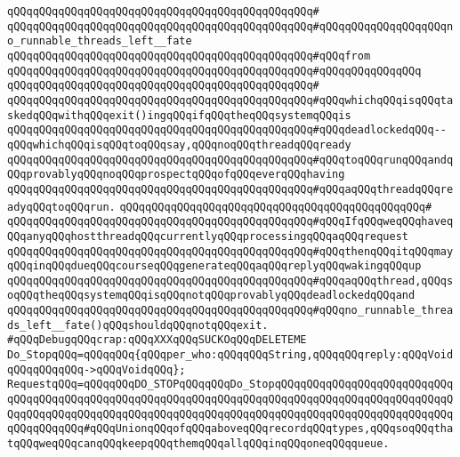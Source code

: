 \verb|qQQqqQQqqQQqqQQqqQQqqQQqqQQqqQQqqQQqqQQqqQQqqQQq#|\newline
\verb|qQQqqQQqqQQqqQQqqQQqqQQqqQQqqQQqqQQqqQQqqQQqqQQq#qQQqqQQqqQQqqQQqqQQqno_runnable_threads_left__fate|\newline
\verb|qQQqqQQqqQQqqQQqqQQqqQQqqQQqqQQqqQQqqQQqqQQqqQQq#qQQqfrom|\newline
\verb|qQQqqQQqqQQqqQQqqQQqqQQqqQQqqQQqqQQqqQQqqQQqqQQq#qQQqqQQqqQQqqQQq|\newline
\verb|qQQqqQQqqQQqqQQqqQQqqQQqqQQqqQQqqQQqqQQqqQQqqQQq#|\newline
\verb|qQQqqQQqqQQqqQQqqQQqqQQqqQQqqQQqqQQqqQQqqQQqqQQq#qQQqwhichqQQqisqQQqtaskedqQQqwithqQQqexit()ingqQQqifqQQqtheqQQqsystemqQQqis|\newline
\verb|qQQqqQQqqQQqqQQqqQQqqQQqqQQqqQQqqQQqqQQqqQQqqQQq#qQQqdeadlockedqQQq--qQQqwhichqQQqisqQQqtoqQQqsay,qQQqnoqQQqthreadqQQqready|\newline
\verb|qQQqqQQqqQQqqQQqqQQqqQQqqQQqqQQqqQQqqQQqqQQqqQQq#qQQqtoqQQqrunqQQqandqQQqprovablyqQQqnoqQQqprospectqQQqofqQQqeverqQQqhaving|\newline
\verb|qQQqqQQqqQQqqQQqqQQqqQQqqQQqqQQqqQQqqQQqqQQqqQQq#qQQqaqQQqthreadqQQqreadyqQQqtoqQQqrun.|\newline
\verb|qQQqqQQqqQQqqQQqqQQqqQQqqQQqqQQqqQQqqQQqqQQqqQQq#|\newline
\verb|qQQqqQQqqQQqqQQqqQQqqQQqqQQqqQQqqQQqqQQqqQQqqQQq#qQQqIfqQQqweqQQqhaveqQQqanyqQQqhostthreadqQQqcurrentlyqQQqprocessingqQQqaqQQqrequest|\newline
\verb|qQQqqQQqqQQqqQQqqQQqqQQqqQQqqQQqqQQqqQQqqQQqqQQq#qQQqthenqQQqitqQQqmayqQQqinqQQqdueqQQqcourseqQQqgenerateqQQqaqQQqreplyqQQqwakingqQQqup|\newline
\verb|qQQqqQQqqQQqqQQqqQQqqQQqqQQqqQQqqQQqqQQqqQQqqQQq#qQQqaqQQqthread,qQQqsoqQQqtheqQQqsystemqQQqisqQQqnotqQQqprovablyqQQqdeadlockedqQQqand|\newline
\verb|qQQqqQQqqQQqqQQqqQQqqQQqqQQqqQQqqQQqqQQqqQQqqQQq#qQQqno_runnable_threads_left__fate()qQQqshouldqQQqnotqQQqexit.|\newline
\newline
\verb|#qQQqDebugqQQqcrap:qQQqXXXqQQqSUCKOqQQqDELETEME|\newline
\verb|Do_StopqQQq=qQQqqQQq{qQQqper_who:qQQqqQQqString,qQQqqQQqreply:qQQqVoidqQQqqQQqqQQq->qQQqVoidqQQq};|\newline
\verb|RequestqQQq=qQQqqQQqDO_STOPqQQqqQQqDo_StopqQQqqQQqqQQqqQQqqQQqqQQqqQQqqQQqqQQqqQQqqQQqqQQqqQQqqQQqqQQqqQQqqQQqqQQqqQQqqQQqqQQqqQQqqQQqqQQqqQQqqQQqqQQqqQQqqQQqqQQqqQQqqQQqqQQqqQQqqQQqqQQqqQQqqQQqqQQqqQQqqQQqqQQqqQQqqQQqqQQq#qQQqUnionqQQqofqQQqaboveqQQqrecordqQQqtypes,qQQqsoqQQqthatqQQqweqQQqcanqQQqkeepqQQqthemqQQqallqQQqinqQQqoneqQQqqueue.|\newline
